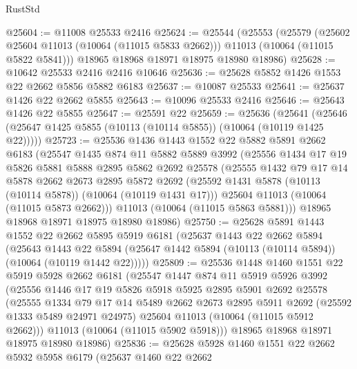 \begin{lexlean}{RustStd}
\begin{coremodule}
@25604 := @11008 @25533 @2416
@25624 := @25544
    (@25553
      (@25579
        (@25602 @25604 @11013 (@10064 (@11015 @5833 @2662)))
        @11013
        (@10064 (@11015 @5822 @5841)))
      @18965
      @18968
      @18971
      @18975
      @18980
      @18986)
@25628 := @10642 @25533 @2416 @2416 @10646
@25636 := @25628 @5852 @1426 @1553 @22 @2662 @5856 @5882 @6183
@25637 := @10087 @25533
@25641 := @25637 @1426 @22 @2662 @5855
@25643 := @10096 @25533 @2416
@25646 := @25643 @1426 @22 @5855
@25647 := @25591 @22
@25659 := @25636
    (@25641 (@25646 (@25647 @1425 @5855 (@10113 (@10114 @5855)) (@10064 (@10119 @1425 @22)))))
@25723 := @25536
    @1436
    @1443
    @1552
    @22
    @5882
    @5891
    @2662
    @6183
    (@25547
      @1435
      @874
      @11
      @5882
      @5889
      @3992
      (@25556
        @1434
        @17
        @19
        @5826
        @5881
        @5888
        @2895
        @5862
        @2692
        @25578
        (@25555
          @1432
          @79
          @17
          @14
          @5878
          @2662
          @2673
          @2895
          @5872
          @2692
          (@25592 @1431 @5878 (@10113 (@10114 @5878)) (@10064 (@10119 @1431 @17)))
          @25604
          @11013
          (@10064 (@11015 @5873 @2662)))
        @11013
        (@10064 (@11015 @5863 @5881)))
      @18965
      @18968
      @18971
      @18975
      @18980
      @18986)
@25750 := @25628
    @5891
    @1443
    @1552
    @22
    @2662
    @5895
    @5919
    @6181
    (@25637
      @1443
      @22
      @2662
      @5894
      (@25643
        @1443
        @22
        @5894
        (@25647 @1442 @5894 (@10113 (@10114 @5894)) (@10064 (@10119 @1442 @22)))))
@25809 := @25536
    @1448
    @1460
    @1551
    @22
    @5919
    @5928
    @2662
    @6181
    (@25547
      @1447
      @874
      @11
      @5919
      @5926
      @3992
      (@25556
        @1446
        @17
        @19
        @5826
        @5918
        @5925
        @2895
        @5901
        @2692
        @25578
        (@25555
          @1334
          @79
          @17
          @14
          @5489
          @2662
          @2673
          @2895
          @5911
          @2692
          (@25592 @1333 @5489 @24971 @24975)
          @25604
          @11013
          (@10064 (@11015 @5912 @2662)))
        @11013
        (@10064 (@11015 @5902 @5918)))
      @18965
      @18968
      @18971
      @18975
      @18980
      @18986)
@25836 := @25628
    @5928
    @1460
    @1551
    @22
    @2662
    @5932
    @5958
    @6179
    (@25637
      @1460
      @22
      @2662

\end{coremodule}
\end{lexlean}
